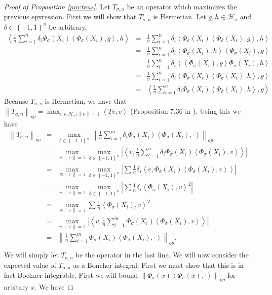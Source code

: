 \documentclass{article} %
\def\hsig{{\mathcal{H}_\sigma}}
\def\fm{{\Phi_\sigma}} %
\def\l{\left}
\def\r{\right}
\theoremstyle{definition}
\begin{document}
\begin{proof}[Proof of Proposition \ref{pro:tens}] 
    Let $T_{\sigma,n}$ be an operator which maximizes the previous epxression. First we will show that $T_{\sigma,n}$ is Hermetian. Let $g,h \in \hsig$ and $\delta \in \left\{ -1,1 \right\}^n$ be arbitrary,
        \begin{eqnarray*}
             \l<\frac{1}{n}\sum_{i=1}^n \delta_i \fm(X_i)\l<\fm(X_i),g\r>,h\r>
            &=& \frac{1}{n}\sum_{i=1}^n\delta_i\l<  \fm(X_i)\l<\fm(X_i),g\r>,h\r>\\
            &=& \frac{1}{n}\sum_{i=1}^n\delta_i  \l<\fm(X_i),h\r> \l<\fm(X_i),g\r>\\
            &=& \frac{1}{n}\sum_{i=1}^n\delta_i  \l<\l<\fm(X_i),g\r>\fm(X_i),h\r> \\
            &=& \frac{1}{n}\sum_{i=1}^n\delta_i\l<  \fm(X_i)\l<\fm(X_i),h\r>,g\r>\\
            &=& \l<\frac{1}{n}\sum_{i=1}^n \delta_i \fm(X_i)\l<\fm(X_i),h\r>,g\r>
        \end{eqnarray*}
        Because $T_{\sigma,n}$ is Hermetian, we have that $\l\|T_{\sigma,n}\r\|_{op} = \max_{v\in \hsig: \l\|v\r\| = 1}\l<Tv,v\r>$ (Proposition 7.36 in \cite{fabian01}). Using this we have
	\begin{eqnarray*}
            \l\|T_{\sigma,n}\r\|_{op}
                &=&  \max_{\delta\in \left\{ -1,1 \right\}^ n}\l\| \frac{1}{n} \sum_{i=1}^m \delta_i\fm\left( X_i \right)\l<\fm(X_i),\cdot \r> \r\|_{op}\\
                &=&  \max_{v:\l\|v\r\|= 1} \max_{\delta\in \left\{ -1,1 \right\}^ n}\l|\l<v,\frac{1}{n}\sum_{i=1}^n \delta_i \fm(X_i) \l<\fm(X_i),v\r>\r>\r| \\
		&=& \max_{v:\l\|v\r\|= 1} \max_{\delta\in \left\{ -1,1 \right\}^ n}\l|\sum \frac{1}{n}\delta_i \l<v, \fm(X_i)\l<\fm(X_i),v\r>\r>\r|\\
		&=& \max_{v:\l\|v\r\|= 1}\max_{\delta\in \left\{ -1,1 \right\}^ n} \l|\sum \frac{1}{n}\delta_i  \l<\fm(X_i),v\r>^2\r|\\
		&=& \max_{v:\l\|v\r\|= 1} \sum \frac{1}{n}\l<\fm(X_i),v\r>^2\\
		&=&  \max_{v:\l\|v\r\|= 1} \l|\l<v,  \frac{1}{n} \sum_{i=1}^m \fm\left( X_i \right)\l<\fm(X_i),v \r> \r>\r|\\
                &=&  \l\| \frac{1}{n} \sum_{i=1}^m \fm\left( X_i \right)\l<\fm(X_i),\cdot \r> \r\|_{op}.\\
	\end{eqnarray*}
        We will simply let $T_{\sigma,n}$ be the operator in the last line. We will now consider the expected value of $T_{\sigma,n}$ as a Boncher integral. First we must show that this is in fact Bochner integrable. First we will bound  $\l\|\fm(x)\l<\fm(x),\cdot\r>\r\|_{op}$ for arbitary $x$. We have

\end{proof}
\end{document}
